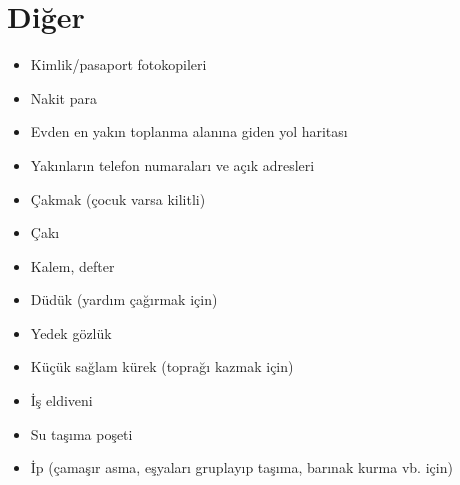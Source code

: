 \chapter*{Diğer}

\begin{itemize}
	\item Kimlik/pasaport fotokopileri
	\item Nakit para
	\item Evden en yakın toplanma alanına giden yol haritası
	\item Yakınların telefon numaraları ve açık adresleri
	\item Çakmak (çocuk varsa kilitli)
	\item Çakı
	\item Kalem, defter
	\item Düdük (yardım çağırmak için)
	\item Yedek gözlük
	\item Küçük sağlam kürek (toprağı kazmak için)
	\item İş eldiveni
	\item Su taşıma poşeti
	\item İp (çamaşır asma, eşyaları gruplayıp taşıma, barınak kurma vb. için)
\end{itemize}